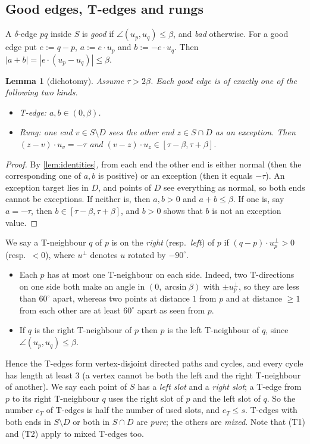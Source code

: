 \documentclass[11pt]{amsart}
\newtheorem{lemma}[theorem]{Lemma}
\theoremstyle{definition}
\theoremstyle{remark}
\begin{document}
\subsection*{Good edges, T-edges and rungs}
A $\delta$-edge $pq$ inside $S$ is \emph{good} if $\angle(u_p,u_q)\le\beta$, and \emph{bad} otherwise. For a good edge put $e:=q-p$, $a:=e\cdot u_p$ and $b:=-e\cdot u_q$. Then $|a+b|=|e\cdot(u_p-u_q)|\le\beta$.

\begin{lemma}[dichotomy]\label{lem:dichotomy}
Assume $\tau>2\beta$. Each good edge is of exactly one of the following two kinds.
\begin{itemize}[leftmargin=2em]
\item \emph{T-edge:} $a,b\in(0,\beta)$.
\item \emph{Rung:} one end $v\in S\setminus D$ sees the other end $z\in S\cap D$ as an exception. Then $(z-v)\cdot u_v=-\tau$ and $(v-z)\cdot u_z\in[\tau-\beta,\tau+\beta]$.
\end{itemize}
\end{lemma}
\begin{proof}
By \cref{lem:identities}, from each end the other end is either normal (then the corresponding one of $a,b$ is positive) or an exception (then it equals $-\tau$). An exception target lies in $D$, and points of $D$ see everything as normal, so both ends cannot be exceptions. If neither is, then $a,b>0$ and $a+b\le\beta$. If one is, say $a=-\tau$, then $b\in[\tau-\beta,\tau+\beta]$, and $b>0$ shows that $b$ is not an exception value.
\end{proof}

We say a T-neighbour $q$ of $p$ is on the \emph{right} (resp.\ \emph{left}) of $p$ if $(q-p)\cdot u_p^{\perp}>0$ (resp.\ $<0$), where $u^\perp$ denotes $u$ rotated by $-90^\circ$.
\begin{itemize}[leftmargin=2em]
\item[(T1)] Each $p$ has at most one T-neighbour on each side. Indeed, two T-directions on one side both make an angle in $(0,\arcsin\beta)$ with $\pm u_p^\perp$, so they are less than $60^\circ$ apart, whereas two points at distance $1$ from $p$ and at distance $\ge 1$ from each other are at least $60^\circ$ apart as seen from $p$.
\item[(T2)] If $q$ is the right T-neighbour of $p$ then $p$ is the left T-neighbour of $q$, since $\angle(u_p,u_q)\le\beta$.
\end{itemize}
Hence the T-edges form vertex-disjoint directed paths and cycles, and every cycle has length at least $3$ (a vertex cannot be both the left and the right T-neighbour of another). We say each point of $S$ has a \emph{left slot} and a \emph{right slot}; a T-edge from $p$ to its right T-neighbour $q$ uses the right slot of $p$ and the left slot of $q$. So the number $e_T$ of T-edges is half the number of used slots, and $e_T\le s$. T-edges with both ends in $S\setminus D$ or both in $S\cap D$ are \emph{pure}; the others are \emph{mixed}. Note that (T1) and (T2) apply to mixed T-edges too.
\end{document}

